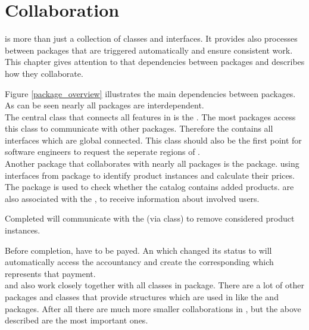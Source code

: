 \chapter{Collaboration}

\salespoint{} is more than just a collection of classes and interfaces. It provides also processes between packages that are triggered automatically and ensure consistent work. This chapter gives attention to that dependencies between packages and describes how they collaborate.  

Figure \ref{package_overview} illustrates the main dependencies between \salespoint{} packages. As can be seen nearly all packages are interdependent.\\ 

The central class that connects all features in \salespoint{} is the . The most packages access this class to communicate with other packages. Therefore the  contains all interfaces which are global connected. This class should also be the first point for software engineers to request the seperate regions of \salespoint{}.\\

Another package that collaborates with nearly all packages is the  package.  using interfaces from  package to identify product instances and calculate their prices. The  package is used to check whether the catalog contains added products.  are also associated with the , to receive information about involved users.\par 
Completed  will communicate with the  (via  class) to remove considered product instances. \par
Before completion,  have to be payed. An  which changed its status to  will automatically access the accountancy and create the corresponding  which represents that payment.\\ 

 and  also work closely together with all classes in  package. There are a lot of other packages and classes that provide structures which are used in \salespoint{} like the  and  packages. After all there are much more smaller collaborations in \salespoint{}, but the above described are the most important ones.




